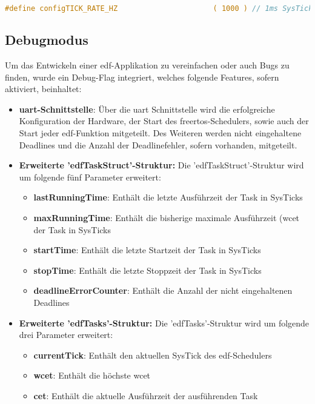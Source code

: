 \documentclass[../EDF Master Thesis.tex]{subfiles}
\begin{document}
\begin{lstlisting}[language=C, caption=FreeRTOS SysTick Deklaration, label=code:freertos_sys_tick_deklaration]
    #define configTICK_RATE_HZ						( 1000 ) // 1ms SysTick
\end{lstlisting}

\subsection{Debugmodus} \label{section:debug_mode}

    Um das Entwickeln einer \ac{edf}-Applikation zu vereinfachen oder auch Bugs zu finden, wurde ein Debug-Flag integriert, welches folgende Features, sofern aktiviert, beinhaltet:

    \begin{itemize}
        \item \textbf{\ac{uart}-Schnittstelle}: Über die \ac{uart} Schnittstelle wird die erfolgreiche Konfiguration der Hardware, der Start des \ac{freertos}-Schedulers, sowie auch der Start jeder \ac{edf}-Funktion mitgeteilt.
                                                 Des Weiteren werden nicht eingehaltene Deadlines und die Anzahl der Deadlinefehler, sofern vorhanden, mitgeteilt.
        \item \textbf{Erweiterte 'edfTaskStruct'-Struktur:} Die 'edfTaskStruct'-Struktur wird um folgende fünf Parameter erweitert:
        \begin{itemize}
            \item \textbf{lastRunningTime}: Enthält die letzte Ausführzeit der Task in SysTicks
            \item \textbf{maxRunningTime}: Enthält die bisherige maximale Ausführzeit (\ac{wcet} der Task in SysTicks
            \item \textbf{startTime}: Enthält die letzte Startzeit der Task in SysTicks
            \item \textbf{stopTime}: Enthält die letzte Stoppzeit der Task in SysTicks
            \item \textbf{deadlineErrorCounter}: Enthält die Anzahl der nicht eingehaltenen Deadlines
        \end{itemize}
        \item \textbf{Erweiterte 'edfTasks'-Struktur:} Die 'edfTasks'-Struktur wird um folgende drei Parameter erweitert:
        \begin{itemize}
            \item \textbf{currentTick}: Enthält den aktuellen SysTick des \ac{edf}-Schedulers
            \item \textbf{wcet}: Enthält die höchste \ac{wcet}
            \item \textbf{cet}: Enthält die aktuelle Ausführzeit der ausführenden Task
        \end{itemize}
    \end{itemize}
\end{document}
